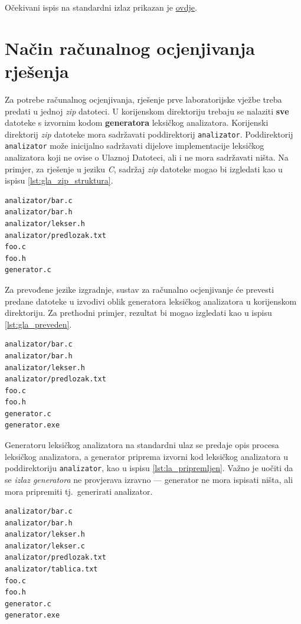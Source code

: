 \documentclass[times, 12pt, utf8]{book}
\begin{document}
Očekivani ispis na standardni izlaz prikazan je \href{https://github.com/fer-ppj/ppj-labosi/raw/master/res/lab1/minus_primjer_izlaz.txt}{ovdje}.

\section{Način računalnog ocjenjivanja rješenja}
Za potrebe računalnog ocjenjivanja, rješenje prve laboratorijske vježbe treba predati u jednoj \emph{zip} datoteci.
U korijenskom direktoriju trebaju se nalaziti \textbf{sve} datoteke s izvornim kodom \textbf{generatora} leksičkog analizatora.
Korijenski direktorij \emph{zip} datoteke mora sadržavati poddirektorij \texttt{analizator}.
Poddirektorij \texttt{analizator} može inicijalno sadržavati dijelove implementacije leksičkog analizatora koji ne ovise o Ulaznoj Datoteci, ali i ne mora sadržavati ništa.
Na primjer, za rješenje u jeziku \emph{C}, sadržaj \emph{zip} datoteke mogao bi izgledati kao u ispisu \ref{lst:gla_zip_struktura}.

\begin{lstlisting}[caption={Primjer sadržaja \emph{zip} datoteke. Imena datoteka \emph{nisu važna}.},label=lst:gla_zip_struktura]
analizator/bar.c
analizator/bar.h
analizator/lekser.h
analizator/predlozak.txt
foo.c
foo.h
generator.c
\end{lstlisting}

Za prevođene jezike izgradnje, sustav za računalno ocjenjivanje će prevesti predane datoteke u izvodivi oblik generatora leksičkog analizatora u korijenskom direktoriju.
Za prethodni primjer, rezultat bi mogao izgledati kao u ispisu \ref{lst:gla_preveden}.

\begin{lstlisting}[caption={Primjer sadržaja korijenskog direktorija nakon prevođenja generatora.},label=lst:gla_preveden]
analizator/bar.c
analizator/bar.h
analizator/lekser.h
analizator/predlozak.txt
foo.c
foo.h
generator.c
generator.exe
\end{lstlisting}

Generatoru leksičkog analizatora na standardni ulaz se predaje opis procesa leksičkog analizatora, a generator priprema izvorni kod leksičkog analizatora u poddirektoriju \texttt{analizator}, kao u ispisu \ref{lst:la_pripremljen}.
Važno je uočiti da se \emph{izlaz generatora} ne provjerava izravno --- generator ne mora ispisati ništa, ali mora pripremiti tj.~generirati analizator.

\begin{lstlisting}[caption={Primjer sadržaja korijenskog direktorija nakon izvođenja generatora.},label=lst:la_pripremljen]
analizator/bar.c
analizator/bar.h
analizator/lekser.h
analizator/lekser.c
analizator/predlozak.txt
analizator/tablica.txt
foo.c
foo.h
generator.c
generator.exe
\end{lstlisting}
\end{document}
